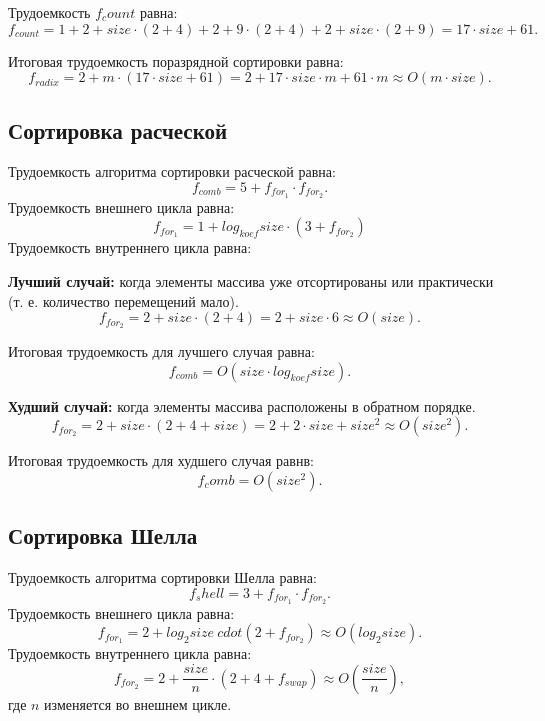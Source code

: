 Трудоемкость $f_count$ равна:
\begin{equation}
	f_{count} = 1 + 2 + size \cdot (2 + 4) + 2 + 9 \cdot(2 + 4) + 2 + size \cdot (2 + 9) = 17 \cdot size + 61.
\end{equation}

Итоговая трудоемкость поразрядной сортировки равна:
\begin{equation}
	f_{radix} = 2 + m \cdot (17 \cdot size + 61) = 2 + 17 \cdot size \cdot m + 61 \cdot m \approx O(m \cdot size).
\end{equation}

\subsection*{Сортировка расческой}
Трудоемкость алгоритма сортировки расческой равна:
\begin{equation}
	f_{comb} = 5 + f_{for_{1}} \cdot f_{for_{2}}.
\end{equation}
Трудоемкость внешнего цикла равна:
\begin{equation}
	f_{for_{1}} = 1 + log_{koef}{size} \cdot(3 + f_{for_{2}}) 
\end{equation}
Трудоемкость внутреннего цикла равна:

\textbf{Лучший случай:} когда элементы массива уже отсортированы или практически (т. е. количество перемещений мало).
\begin{equation}
	f_{for_{2}} = 2 + size \cdot(2 + 4) =  2 + size \cdot 6 \approx O(size).
\end{equation}

Итоговая трудоемкость для лучшего случая равна: 
\begin{equation}
	f_{comb} = O(size \cdot log_{koef}{size}).
\end{equation}

\textbf{Худший случай:} когда элементы массива расположены в обратном порядке.
\begin{equation}
	f_{for_{2}} = 2 + size \cdot(2 + 4 + size) =  2 + 2 \cdot size + size^2 \approx O(size^2).
\end{equation}

Итоговая трудоемкость для худшего случая равнв: 
\begin{equation}
	f_comb = O(size^2).
\end{equation}

\subsection*{Сортировка Шелла}
Трудоемкость алгоритма сортировки Шелла равна:
\begin{equation}
	f_shell = 3 + f_{for_{1}} \cdot f_{for_{2}}.
\end{equation}
Трудоемкость внешнего цикла равна:
\begin{equation}
	f_{for_{1}} = 2 + log_2{size} \ cdot (2 + f_{for_{2}}) \approx O(log_2{size}) .
\end{equation}
Трудоемкость внутреннего цикла равна:
\begin{equation}
	f_{for_{2}} = 2 + \frac{size}{n} \cdot (2 + 4 + f_{swap}) \approx O(\frac{size}{n}), 
\end{equation}
где $n$ изменяется во внешнем цикле.

